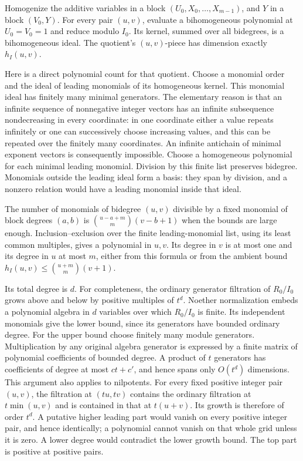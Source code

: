 \documentclass[
  11pt,
  a4paper,
]{article}
\begin{document}
Homogenize the additive variables in a block
\((U_0,X_0,\ldots,X_{m-1})\), and \(Y\) in a block \((V_0,Y)\). For
every pair \((u,v)\), evaluate a bihomogeneous polynomial at
\(U_0=V_0=1\) and reduce modulo \(I_0\). Its kernel, summed over all
bidegrees, is a bihomogeneous ideal. The quotient's \((u,v)\)-piece has
dimension exactly \(h_I(u,v)\).

Here is a direct polynomial count for that quotient. Choose a monomial
order and the ideal of leading monomials of its homogeneous kernel. This
monomial ideal has finitely many minimal generators. The elementary
reason is that an infinite sequence of nonnegative integer vectors has
an infinite subsequence nondecreasing in every coordinate: in one
coordinate either a value repeats infinitely or one can successively
choose increasing values, and this can be repeated over the finitely
many coordinates. An infinite antichain of minimal exponent vectors is
consequently impossible. Choose a homogeneous polynomial for each
minimal leading monomial. Division by this finite list preserves
bidegree. Monomials outside the leading ideal form a basis: they span by
division, and a nonzero relation would have a leading monomial inside
that ideal.

The number of monomials of bidegree \((u,v)\) divisible by a fixed
monomial of block degrees \((a,b)\) is \(\binom{u-a+m}{m}(v-b+1)\) when
the bounds are large enough. Inclusion--exclusion over the finite
leading-monomial list, using its least common multiples, gives a
polynomial in \(u,v\). Its degree in \(v\) is at most one and its degree
in \(u\) at most \(m\), either from this formula or from the ambient
bound \(h_I(u,v)\le\binom{u+m}{m}(v+1)\).

Its total degree is \(d\). For completeness, the ordinary generator
filtration of \(R_0/I_0\) grows above and below by positive multiples of
\(t^d\). Noether normalization embeds a polynomial algebra in \(d\)
variables over which \(R_0/I_0\) is finite. Its independent monomials
give the lower bound, since its generators have bounded ordinary degree.
For the upper bound choose finitely many module generators.
Multiplication by any original algebra generator is expressed by a
finite matrix of polynomial coefficients of bounded degree. A product of
\(t\) generators has coefficients of degree at most \(ct+c'\), and hence
spans only \(O(t^d)\) dimensions. This argument also applies to
nilpotents. For every fixed positive integer pair \((u,v)\), the
filtration at \((tu,tv)\) contains the ordinary filtration at
\(t\min(u,v)\) and is contained in that at \(t(u+v)\). Its growth is
therefore of order \(t^d\). A putative higher leading part would vanish
on every positive integer pair, and hence identically; a polynomial
cannot vanish on that whole grid unless it is zero. A lower degree would
contradict the lower growth bound. The top part is positive at positive
pairs.
\end{document}
